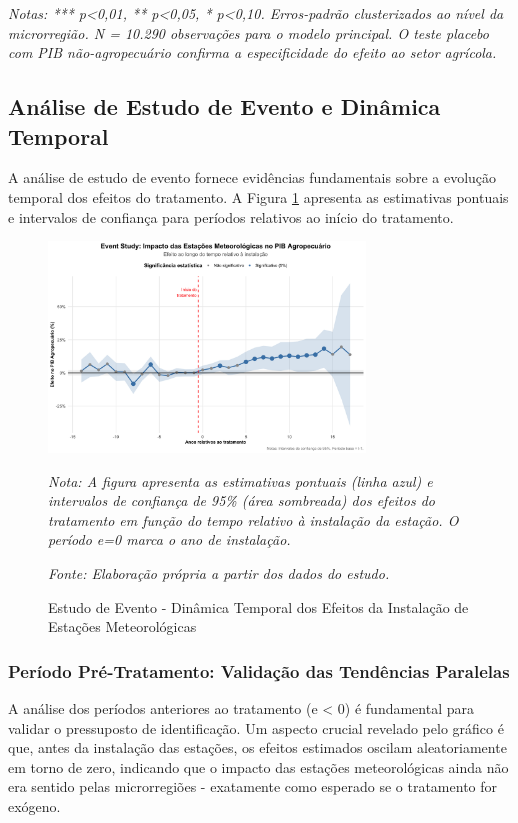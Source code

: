 \documentclass[
	12pt,				%
	oneside,			%
	a4paper,			%
	english,			%
	french,				%
	spanish,			%
	brazil				%
	]{abntex2}
\begin{document}
\textit{Notas: *** p<0,01, ** p<0,05, * p<0,10. Erros-padrão clusterizados ao nível da microrregião. N = 10.290 observações para o modelo principal. O teste placebo com PIB não-agropecuário confirma a especificidade do efeito ao setor agrícola.}

\subsection{Análise de Estudo de Evento e Dinâmica Temporal}

A análise de estudo de evento fornece evidências fundamentais sobre a evolução temporal dos efeitos do tratamento. A Figura \ref{fig:eventstudy} apresenta as estimativas pontuais e intervalos de confiança para períodos relativos ao início do tratamento.

\begin{figure}[H]
\centering
\caption{Estudo de Evento - Dinâmica Temporal dos Efeitos da Instalação de Estações Meteorológicas}
\label{fig:eventstudy}
\includegraphics[width=0.75\textwidth]{../../../data/outputs/presentation/event_study_enhanced.png}

\textit{Nota: A figura apresenta as estimativas pontuais (linha azul) e intervalos de confiança de 95\% (área sombreada) dos efeitos do tratamento em função do tempo relativo à instalação da estação. O período e=0 marca o ano de instalação.}

\textit{Fonte: Elaboração própria a partir dos dados do estudo.}
\end{figure}

\subsubsection{Período Pré-Tratamento: Validação das Tendências Paralelas}

A análise dos períodos anteriores ao tratamento (e < 0) é fundamental para validar o pressuposto de identificação. Um aspecto crucial revelado pelo gráfico é que, antes da instalação das estações, os efeitos estimados oscilam aleatoriamente em torno de zero, indicando que o impacto das estações meteorológicas ainda não era sentido pelas microrregiões - exatamente como esperado se o tratamento for exógeno.
\end{document}

